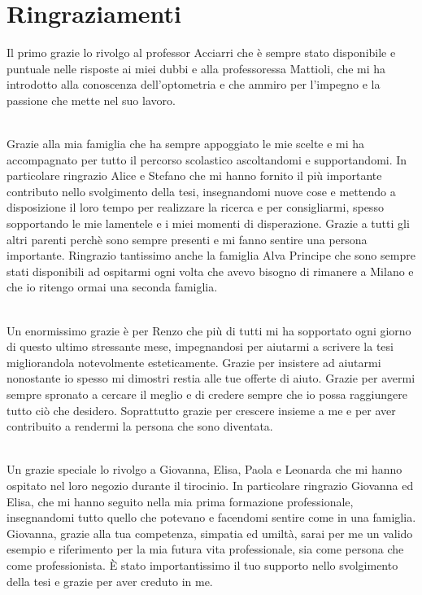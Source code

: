 \chapter*{Ringraziamenti}

Il primo grazie lo rivolgo al professor Acciarri che è sempre stato disponibile e puntuale nelle risposte ai miei dubbi e alla professoressa Mattioli, che mi ha introdotto alla conoscenza dell’optometria e che ammiro per l’impegno e la passione che mette nel suo lavoro.
\\\

Grazie alla mia famiglia che ha sempre appoggiato le mie scelte e mi ha accompagnato per tutto il percorso scolastico ascoltandomi e supportandomi. In particolare ringrazio Alice e Stefano che mi hanno fornito il più importante contributo nello svolgimento della tesi, insegnandomi nuove cose e mettendo a disposizione il loro tempo per realizzare la ricerca e per consigliarmi, spesso sopportando le mie lamentele e i miei momenti di disperazione. Grazie a tutti gli altri parenti perchè sono sempre presenti e mi fanno sentire una persona importante. Ringrazio tantissimo anche la famiglia Alva Principe che sono sempre stati disponibili ad ospitarmi ogni volta che avevo bisogno di rimanere a Milano e che io ritengo ormai una seconda famiglia.
\\\

Un enormissimo grazie è per Renzo che più di tutti mi ha sopportato ogni giorno di questo ultimo stressante mese, impegnandosi per aiutarmi a scrivere la tesi migliorandola notevolmente esteticamente. Grazie per insistere ad aiutarmi nonostante io spesso mi dimostri restia alle tue offerte di aiuto. Grazie per avermi sempre spronato a cercare il meglio e di credere sempre che io possa raggiungere tutto ciò che desidero. Soprattutto grazie per crescere insieme a me e per aver contribuito a rendermi la persona che sono diventata.
\\\

Un grazie speciale lo rivolgo a Giovanna, Elisa, Paola e Leonarda che mi hanno ospitato nel loro negozio durante il tirocinio. In particolare ringrazio Giovanna ed Elisa, che mi hanno seguito nella mia prima formazione professionale, insegnandomi tutto quello che potevano e facendomi sentire come in una famiglia. Giovanna, grazie alla tua competenza, simpatia ed umiltà, sarai per me un valido esempio e riferimento per la mia futura vita professionale, sia come persona che come professionista. È stato importantissimo il tuo supporto nello svolgimento della tesi e grazie per aver creduto in me.
\\\

